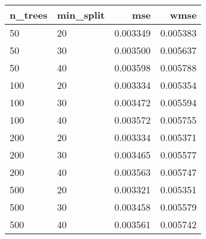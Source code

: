 \begin{tabular}{llrr}
\toprule
n\_trees & min\_split &      mse &     wmse \\
\midrule
     50 &        20 & 0.003349 & 0.005383 \\
     50 &        30 & 0.003500 & 0.005637 \\
     50 &        40 & 0.003598 & 0.005788 \\
    100 &        20 & 0.003334 & 0.005354 \\
    100 &        30 & 0.003472 & 0.005594 \\
    100 &        40 & 0.003572 & 0.005755 \\
    200 &        20 & 0.003334 & 0.005371 \\
    200 &        30 & 0.003465 & 0.005577 \\
    200 &        40 & 0.003563 & 0.005747 \\
    500 &        20 & 0.003321 & 0.005351 \\
    500 &        30 & 0.003458 & 0.005579 \\
    500 &        40 & 0.003561 & 0.005742 \\
\bottomrule
\end{tabular}
